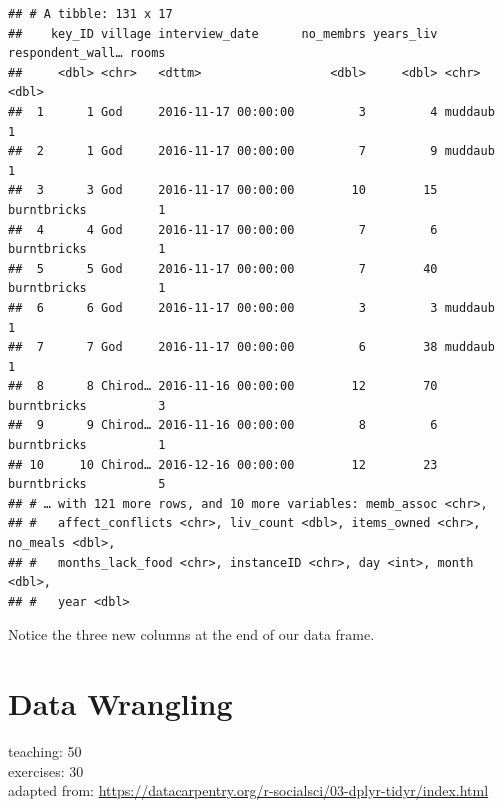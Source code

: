 \documentclass[]{book}
\newenvironment{Shaded}{\begin{snugshade}}{\end{snugshade}}
\newcommand{\KeywordTok}[1]{\textcolor[rgb]{0.13,0.29,0.53}{\textbf{#1}}}
\newcommand{\StringTok}[1]{\textcolor[rgb]{0.31,0.60,0.02}{#1}}
\newcommand{\OperatorTok}[1]{\textcolor[rgb]{0.81,0.36,0.00}{\textbf{#1}}}
\newcommand{\NormalTok}[1]{#1}
\begin{document}
\begin{Shaded}
\end{Shaded}

\begin{verbatim}
## # A tibble: 131 x 17
##    key_ID village interview_date      no_membrs years_liv respondent_wall… rooms
##     <dbl> <chr>   <dttm>                  <dbl>     <dbl> <chr>            <dbl>
##  1      1 God     2016-11-17 00:00:00         3         4 muddaub              1
##  2      1 God     2016-11-17 00:00:00         7         9 muddaub              1
##  3      3 God     2016-11-17 00:00:00        10        15 burntbricks          1
##  4      4 God     2016-11-17 00:00:00         7         6 burntbricks          1
##  5      5 God     2016-11-17 00:00:00         7        40 burntbricks          1
##  6      6 God     2016-11-17 00:00:00         3         3 muddaub              1
##  7      7 God     2016-11-17 00:00:00         6        38 muddaub              1
##  8      8 Chirod… 2016-11-16 00:00:00        12        70 burntbricks          3
##  9      9 Chirod… 2016-11-16 00:00:00         8         6 burntbricks          1
## 10     10 Chirod… 2016-12-16 00:00:00        12        23 burntbricks          5
## # … with 121 more rows, and 10 more variables: memb_assoc <chr>,
## #   affect_conflicts <chr>, liv_count <dbl>, items_owned <chr>, no_meals <dbl>,
## #   months_lack_food <chr>, instanceID <chr>, day <int>, month <dbl>,
## #   year <dbl>
\end{verbatim}

Notice the three new columns at the end of our data frame.

\chapter{Data Wrangling}\label{data-wrangling}

teaching: 50\\
exercises: 30\\
adapted from:
\url{https://datacarpentry.org/r-socialsci/03-dplyr-tidyr/index.html}
\end{document}
